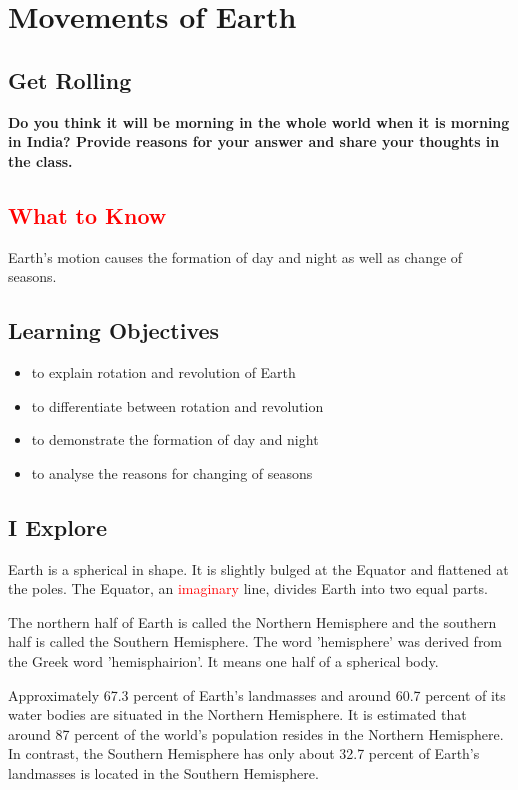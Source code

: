 \chapter{Movements of Earth}
\section{Get Rolling}
\textbf{Do you think it will be morning in the whole world when it is morning in India? Provide reasons for your answer and share your thoughts in the class.}
\section{\textcolor{red}{What to Know}}
Earth's motion causes the formation of day and night as well as change of seasons.
\section{\textbf{Learning Objectives}}
\begin{itemize}
    \item to explain rotation and revolution of Earth
    \item to differentiate between rotation and revolution
    \item to demonstrate the formation of day and night
    \item to analyse the reasons for changing of seasons
\end{itemize}
\section{I Explore}
Earth is a spherical in shape. It is slightly bulged at the Equator and flattened at the poles. The Equator, an \textcolor{red}{imaginary} line, divides Earth into two equal parts.
\par
\vspace{0.1in}
The northern half of Earth is called the Northern Hemisphere and the southern half is called the Southern Hemisphere. The word 'hemisphere' was derived from the Greek word 'hemisphairion'. It means one half of a spherical body.
\par
Approximately 67.3 percent of Earth's landmasses and around 60.7 percent of its water bodies are situated in the Northern Hemisphere. It is estimated that around 87 percent of the world's population resides in the Northern Hemisphere. In contrast, the Southern Hemisphere has only about 32.7 percent of Earth's landmasses is located in the Southern Hemisphere.
